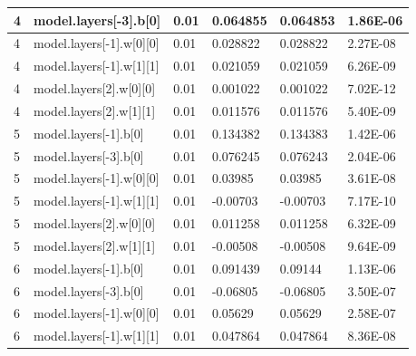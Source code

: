 \documentclass{article} %
\begin{document}
\begin{table}[]
\begin{tabular}{|l|l|l|l|l|l|}
4              & model.layers{[}-3{]}.b{[}0{]}        & 0.01             & 0.064855          & 0.064853        & 1.86E-06       \\ \hline
4              & model.layers{[}-1{]}.w{[}0{]}{[}0{]} & 0.01             & 0.028822          & 0.028822        & 2.27E-08       \\ \hline
4              & model.layers{[}-1{]}.w{[}1{]}{[}1{]} & 0.01             & 0.021059          & 0.021059        & 6.26E-09       \\ \hline
4              & model.layers{[}2{]}.w{[}0{]}{[}0{]}  & 0.01             & 0.001022          & 0.001022        & 7.02E-12       \\ \hline
4              & model.layers{[}2{]}.w{[}1{]}{[}1{]}  & 0.01             & 0.011576          & 0.011576        & 5.40E-09       \\ \hline
5              & model.layers{[}-1{]}.b{[}0{]}        & 0.01             & 0.134382          & 0.134383        & 1.42E-06       \\ \hline
5              & model.layers{[}-3{]}.b{[}0{]}        & 0.01             & 0.076245          & 0.076243        & 2.04E-06       \\ \hline
5              & model.layers{[}-1{]}.w{[}0{]}{[}0{]} & 0.01             & 0.03985           & 0.03985         & 3.61E-08       \\ \hline
5              & model.layers{[}-1{]}.w{[}1{]}{[}1{]} & 0.01             & -0.00703          & -0.00703        & 7.17E-10       \\ \hline
5              & model.layers{[}2{]}.w{[}0{]}{[}0{]}  & 0.01             & 0.011258          & 0.011258        & 6.32E-09       \\ \hline
5              & model.layers{[}2{]}.w{[}1{]}{[}1{]}  & 0.01             & -0.00508          & -0.00508        & 9.64E-09       \\ \hline
6              & model.layers{[}-1{]}.b{[}0{]}        & 0.01             & 0.091439          & 0.09144         & 1.13E-06       \\ \hline
6              & model.layers{[}-3{]}.b{[}0{]}        & 0.01             & -0.06805          & -0.06805        & 3.50E-07       \\ \hline
6              & model.layers{[}-1{]}.w{[}0{]}{[}0{]} & 0.01             & 0.05629           & 0.05629         & 2.58E-07       \\ \hline
6              & model.layers{[}-1{]}.w{[}1{]}{[}1{]} & 0.01             & 0.047864          & 0.047864        & 8.36E-08       \\ \hline

\end{tabular}
\end{table}
\end{document}
